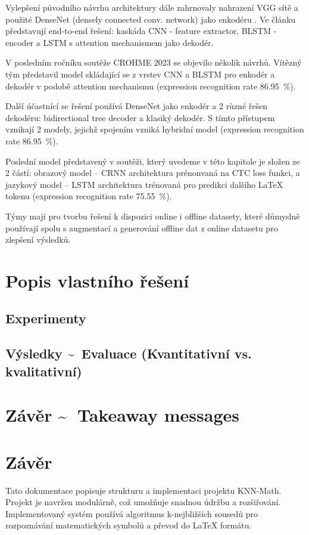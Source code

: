 Vylepšení původního návrhu architektury dále zahrnovaly nahrazení VGG sítě a použité DenseNet (densely connected conv. network) jako enkodéru \cite{ZHANG_2}. Ve článku \cite{LeAnhDuc} představují end-to-end řešení: kaskáda CNN - feature extractor, BLSTM - encoder a LSTM s attention mechanismem jako dekodér.

V posledním ročníku soutěže CROHME 2023 se objevilo několik návrhů. Vítězný tým představil model skládající se z vrstev CNN a BLSTM pro enkodér a dekodér v podobě attention mechanismu (expression recognition rate 86.95~\%).

Další účastnící se řešení používá DenseNet jako enkodér a 2 různé řešen dekodéru: bidirectional tree decoder a klasiký dekodér. S tímto přístupem vznikají 2 modely, jejichž spojením vzniká hybridní model (expression recognition rate 86.95~\%). 

Poslední model představený v soutěži, který uvedeme v této kapitole je složen ze 2 částí: obrazový model -- CRNN architektura prénonvaná na CTC loss funkci, a jazykový model -- LSTM architektura trénovaná pro predikci dalšího LaTeX tokenu (expression recognition rate 75.55~\%).

Týmy mají pro tvorbu řešení k dispozici online i offline datasety, které důmyslně používají spolu s augmentací a generování offline dat z online datasetu pro zlepšení výsledků.

\cite{CROHME_2023}



\section{Popis vlastního řešení}

\subsection{Experimenty}

\subsection{Výsledky \~~Evaluace (Kvantitativní vs. kvalitativní)}	

\section{Závěr \~~Takeaway messages}


\newpage
\section{Závěr}
Tato dokumentace popisuje strukturu a implementaci projektu KNN-Math. Projekt je navržen modulárně, což umožňuje snadnou údržbu a rozšiřování. Implementovaný systém používá algoritmus k-nejbližších sousedů pro rozpoznávání matematických symbolů a převod do LaTeX formátu.





